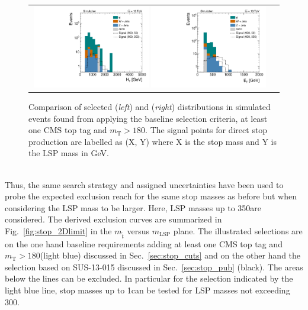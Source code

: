 \begin{figure}[!t]
  \centering
  \begin{tabular}{cc}
   
      \includegraphics[width=0.49\textwidth]{figures/Stop_TopTagTransverseMass_HThad_HighLSPMass.pdf}  
      \includegraphics[width=0.49\textwidth]{figures/Stop_TopTagTransverseMass_MET_HighLSPMass.pdf} 
    \end{tabular}
 
  \caption{Comparison of selected \HT (\textit{left}) and \met (\textit{right}) distributions in simulated events found from applying the baseline selection criteria, at least one CMS top tag and $m_\mathrm{T} > 180$\gev. The signal points for direct stop production are labelled as (X, Y) where X is the stop mass and Y is the LSP mass in GeV.}
  \label{fig:stop_highLSP_ht_met}
\end{figure}
\\
Thus, the same search strategy and assigned uncertainties have been used to probe the expected exclusion reach for the same stop masses as before but when considering the LSP mass to be larger. Here, LSP masses up to 350\gev are considered. The derived exclusion curves are summarized in Fig.~\ref{fig:stop_2Dlimit} in the $m_{\tilde{t}}$ versus $m_\mathrm{LSP}$ plane. The illustrated selections are on the one hand baseline requirements adding at least one CMS top tag and $m_\mathrm{T} > 180$\gev (light blue) discussed in Sec.~\ref{sec:stop_cuts} and on the other hand the selection based on SUS-13-015 discussed in Sec.~\ref{sec:stop_pub} (black). The areas below the lines can be excluded. In particular for the selection indicated by the light blue line, stop masses up to 1\tev can be tested for LSP masses not exceeding 300\gev. \\

